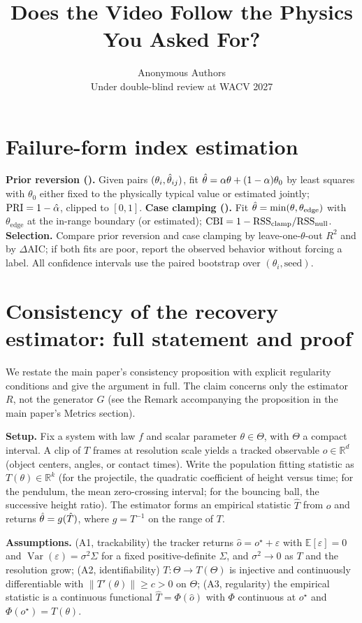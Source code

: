 \documentclass[10pt,twocolumn,letterpaper]{article}
\title{\textbf{Does the Video Follow the Physics You Asked For?}}
\author{Anonymous Authors\\ Under double-blind review at WACV 2027}
\begin{document}
\maketitlesupplementary

\section{Failure-form index estimation}
\label{app:pri}
\textbf{Prior reversion (\PRI).} Given pairs $(\theta_i,\hat{\theta}_{ij})$, fit
$\hat{\theta}=\alpha\theta+(1-\alpha)\theta_0$ by least squares with $\theta_0$
either fixed to the physically typical value or estimated jointly; $\mathrm{PRI}=1-\hat\alpha$,
clipped to $[0,1]$. \textbf{Case clamping (\CBI).} Fit
$\hat{\theta}=\min(\theta,\theta_{\text{edge}})$ with $\theta_{\text{edge}}$ at the
in-range boundary (or estimated); $\mathrm{CBI}=1-\mathrm{RSS}_{\text{clamp}}/\mathrm{RSS}_{\text{null}}$.
\textbf{Selection.} Compare prior reversion and case clamping by leave-one-$\theta$-out $R^2$ and by
$\Delta$AIC; if both fits are poor, report the observed behavior without forcing
a label. All confidence intervals use the paired bootstrap over
$(\theta_i,\text{seed})$.

\section{Consistency of the recovery estimator: full statement and proof}
\label{app:proof}
We restate the main paper's consistency proposition with explicit regularity
conditions and give the argument in full. The claim concerns only the estimator
$R$, not the generator $G$ (see the Remark accompanying the proposition in the
main paper's Metrics section).

\textbf{Setup.} Fix a system with law $f$ and scalar parameter
$\theta\in\Theta$, with $\Theta$ a compact interval. A clip of $T$ frames at
resolution scale yields a tracked observable $o\in\mathbb{R}^{d}$ (object
centers, angles, or contact times). Write the population fitting statistic as
$T(\theta)\in\mathbb{R}^{k}$ (for the projectile, the quadratic coefficient of
height versus time; for the pendulum, the mean zero-crossing interval; for the
bouncing ball, the successive height ratio). The estimator forms an empirical
statistic $\hat T$ from $o$ and returns $\hat{\theta}=g(\hat T)$, where
$g=T^{-1}$ on the range of $T$.

\textbf{Assumptions.} (A1, trackability) the tracker returns
$\hat o = o^\star + \varepsilon$ with $\mathbb{E}[\varepsilon]=0$ and
$\operatorname{Var}(\varepsilon)=\sigma^2 \Sigma$ for a fixed positive-definite
$\Sigma$, and $\sigma^2\to 0$ as $T$ and the resolution grow; (A2,
identifiability) $T:\Theta\to T(\Theta)$ is injective and continuously
differentiable with $\|T'(\theta)\|\ge c>0$ on $\Theta$; (A3, regularity) the
empirical statistic is a continuous functional $\hat T=\Phi(\hat o)$ with $\Phi$
continuous at $o^\star$ and $\Phi(o^\star)=T(\theta)$.
\end{document}
